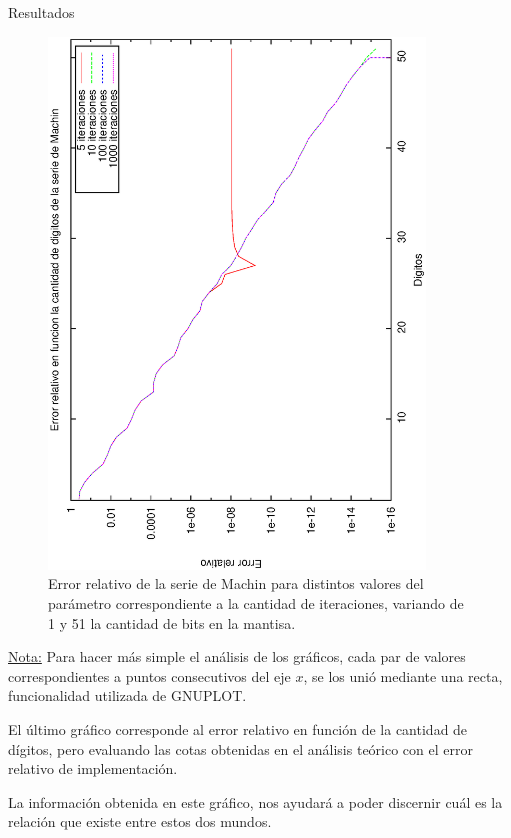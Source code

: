 \begin{section}{Resultados}
	\begin{figure}[H]
	  \centering
		\includegraphics[width=10cm,angle=-90]{graficos/machin_1a51p.eps}
	  \caption{Error relativo de la serie de Machin para distintos valores del parámetro correspondiente a la cantidad de iteraciones, variando de 1 y 51 la cantidad de bits en la mantisa.}
	  \label{fig:machin_51p}
	\end{figure}
	
	\VSP

	\underline{Nota:} Para hacer más simple el análisis de los gráficos, cada par de valores correspondientes a puntos consecutivos del eje $x$, se los unió mediante una recta, funcionalidad utilizada de GNUPLOT.
	
	\pa
	
	El último gráfico corresponde al error relativo en función de la cantidad de dígitos, pero evaluando las cotas obtenidas en el análisis teórico con el error relativo de implementación.
	
	La información obtenida en este gráfico, nos ayudará a poder discernir cuál es la relación que existe entre estos dos mundos.
	
	\VSP
	

\end{section}
